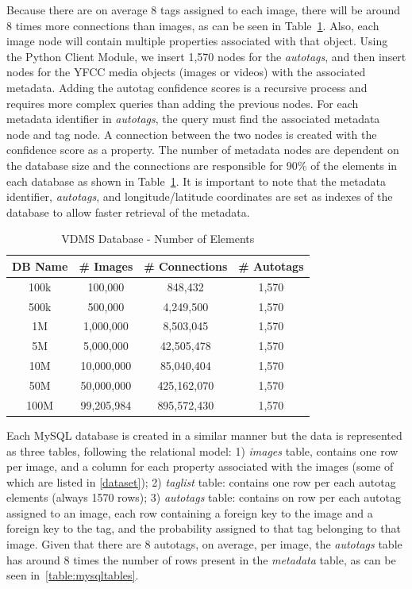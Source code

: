 Because there are on average 8 tags assigned to each image,
there will be around 8 times more connections than images, as can be seen
in Table~\ref{table:vdmsnodes}.
Also, each image node will contain multiple properties associated
with that object.
Using the Python Client Module, we insert 1,570 nodes for the \textit{autotags},
and then insert nodes for the YFCC media objects (images or videos)
with the associated metadata.
Adding the autotag confidence scores is a recursive process and requires more
complex queries than adding the previous nodes.
For each metadata identifier in \textit{autotags},
the query must find the associated metadata node and tag node.
A connection between the two nodes is created with the confidence score as a
property. The number of metadata nodes are dependent on the database size and
the connections are responsible for 90\% of the elements in each database as
shown in Table~\ref{table:vdmsnodes}.
It is important to note that the metadata identifier, \textit{autotags}, and
longitude/latitude coordinates are set as indexes of the database to allow
faster retrieval of the metadata.

\begin{table}[h]
\caption{VDMS Database - Number of Elements}
\centering
\begin{tabular}{c c c c}
\hline\hline
DB Name & \# Images & \# Connections & \# Autotags\\
\hline
100k & 100,000     & 848,432      & 1,570\\
500k & 500,000     & 4,249,500    & 1,570\\
1M   & 1,000,000   & 8,503,045    & 1,570\\
5M   & 5,000,000   & 42,505,478   & 1,570\\
10M  & 10,000,000  & 85,040,404   & 1,570\\
50M  & 50,000,000  & 425,162,070  & 1,570\\
100M & 99,205,984  & 895,572,430  & 1,570\\
\hline
\end{tabular}
\label{table:vdmsnodes}
\end{table}

Each MySQL database is created in a similar manner but the data is represented
as three tables, following the relational model:
1) \textit{images} table, contains one row per image,
and a column for each property
associated with the images (some of which are listed in \ref{dataset});
2) \textit{taglist} table: contains one row per each autotag elements
(always 1570 rows);
3) \textit{autotags} table: contains on row per each autotag
assigned to an image, each row containing a foreign key to the
image and a foreign key to the tag, and
the probability assigned to that tag belonging to that image.
Given that there are 8 autotags, on average, per image, the \textit{autotags}
table has around 8 times the number of rows present in the
\textit{metadata} table, as can be seen in~\ref{table:mysqltables}.

